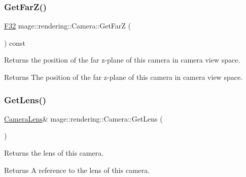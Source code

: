 \hypertarget{classmage_1_1rendering_1_1_camera_a461777ca352f55ae2426bac8105fa2f7}{}\label{classmage_1_1rendering_1_1_camera_a461777ca352f55ae2426bac8105fa2f7} 
\subsubsection{\texorpdfstring{Get\+Far\+Z()}{GetFarZ()}}
{\footnotesize\ttfamily \hyperlink{namespacemage_aa97e833b45f06d60a0a9c4fc22ae02c0}{F32} mage\+::rendering\+::\+Camera\+::\+Get\+FarZ (\begin{DoxyParamCaption}{ }\end{DoxyParamCaption}) const\hspace{0.3cm}{\ttfamily [noexcept]}}

Returns the position of the far z-\/plane of this camera in camera view space.

\begin{DoxyReturn}{Returns}
The position of the far z-\/plane of this camera in camera view space. 
\end{DoxyReturn}
\hypertarget{classmage_1_1rendering_1_1_camera_a49967d5b733b8d2e1ccbfc71c4f66d42}{}\label{classmage_1_1rendering_1_1_camera_a49967d5b733b8d2e1ccbfc71c4f66d42} 
\subsubsection{\texorpdfstring{Get\+Lens()}{GetLens()}\hspace{0.1cm}{\footnotesize\ttfamily [1/2]}}
{\footnotesize\ttfamily \hyperlink{classmage_1_1rendering_1_1_camera_lens}{Camera\+Lens}\& mage\+::rendering\+::\+Camera\+::\+Get\+Lens (\begin{DoxyParamCaption}{ }\end{DoxyParamCaption})\hspace{0.3cm}{\ttfamily [noexcept]}}

Returns the lens of this camera.

\begin{DoxyReturn}{Returns}
A reference to the lens of this camera. 
\end{DoxyReturn}
\hypertarget{classmage_1_1rendering_1_1_camera_a3a1156907006b4d60a4e36789216e31a}{}\label{classmage_1_1rendering_1_1_camera_a3a1156907006b4d60a4e36789216e31a} 
